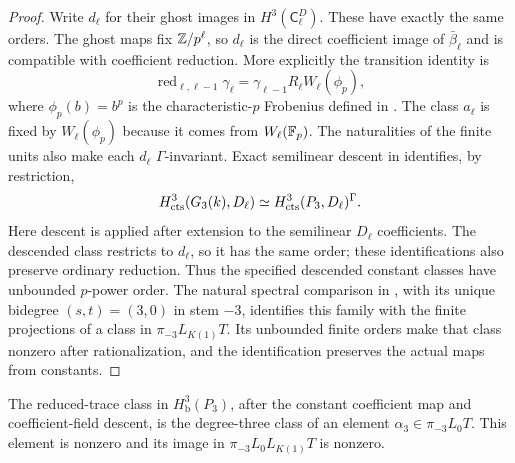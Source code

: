 \begin{proof}
Write $d_\ell$ for their ghost images in $H^3(\mathsf C^D_\ell)$.
These have exactly the same orders.  The ghost maps fix
$\mathbb Z/p^\ell$, so $d_\ell$ is the direct coefficient image
of $\bar\beta_\ell$ and is compatible with coefficient reduction.
More explicitly the transition identity is
\[
 \operatorname{red}_{\ell,\ell-1}\gamma_\ell
       =\gamma_{\ell-1}R_\ell W_\ell(\phi_p),
\]
where $\phi_p(b)=b^p$ is the characteristic-$p$ Frobenius defined
in .  The class $a_\ell$ is fixed by
$W_\ell(\phi_p)$ because it comes from $W_\ell(\mathbb F_p)$.
The naturalities of the finite units also make each $d_\ell$
$\Gamma$-invariant.  Exact semilinear descent in
 identifies, by restriction,
\[
 H^3_{\mathrm{cts}}(G_3(k),D_\ell)
       \simeq H^3_{\mathrm{cts}}(P_3,D_\ell)^\Gamma.
\]
Here descent is applied after extension to the semilinear $D_\ell$
coefficients.
The descended class restricts to $d_\ell$, so it has the same order;
these identifications also preserve ordinary reduction.  Thus the
specified descended constant classes have unbounded $p$-power order.
The natural
spectral comparison in , with its
unique bidegree $(s,t)=(3,0)$ in stem $-3$, identifies this family
with the finite projections of a class in $\pi_{-3}L_{K(1)}T$.
Its unbounded finite orders make that class nonzero after
rationalization, and the identification preserves the actual maps
from constants.
\end{proof}

\begin{lemma}\label{h3:lem:constants-origin}
The reduced-trace class in $H^3_{\mathrm b}(P_3)$, after the
constant coefficient map and coefficient-field descent, is the
degree-three class of an element
$\alpha_3\in\pi_{-3}L_0T$.  This element is nonzero and its
image in $\pi_{-3}L_0L_{K(1)}T$ is nonzero.
\end{lemma}

